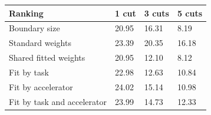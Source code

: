 \begin{tabular}{@{}llll@{}}
\toprule
Ranking & 1 cut & 3 cuts & 5 cuts \\
\midrule
Boundary size & 20.95 & 16.31 & 8.19 \\
Standard weights & 23.39 & 20.35 & 16.18 \\
Shared fitted weights & 20.95 & 12.10 & 8.12 \\
Fit by task & 22.98 & 12.63 & 10.84 \\
Fit by accelerator & 24.02 & 15.14 & 10.98 \\
Fit by task and accelerator & 23.99 & 14.73 & 12.33 \\
\bottomrule
\end{tabular}
